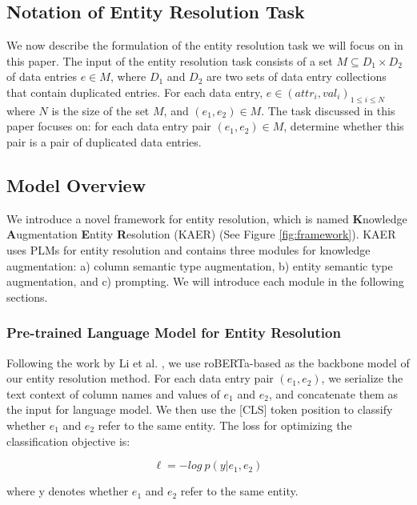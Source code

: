 


\subsection{Notation of Entity Resolution Task}
We now describe the formulation of the entity resolution task we will focus on in this paper. The input of the entity resolution task consists of a set $M \subseteq D_1 \times D_2$ of data entries $e \in M$, where $D_1$ and $D_2$ are two sets of data entry collections that contain duplicated entries. 
For each data entry, $e \in {(attr_i, val_i)}_{1 \leq i \leq N}$ where $N$ is the size of the set $M$, and $(e_1, e_2) \in M$. The task discussed in this paper focuses on: for each data entry pair $(e_1, e_2) \in M$, determine whether this pair is a pair of duplicated data entries.

\subsection{Model Overview}
We introduce a novel framework for entity resolution, which is named \textbf{K}nowledge \textbf{A}ugmentation \textbf{E}ntity \textbf{R}esolution (KAER) (See Figure \ref{fig:framework}).
KAER uses PLMs for entity resolution and contains three modules for knowledge augmentation: a) column semantic type augmentation, b) entity semantic type augmentation, and c) prompting. We will introduce each module in the following sections.


\subsubsection{Pre-trained Language Model for Entity Resolution}
Following the work by Li et al. \cite{li_deep_2020}, we use roBERTa-based as the backbone model of our entity resolution method. For each data entry pair $(e_1, e_2)$, we serialize the text context of column names and values of $e_1$ and $e_2$, and concatenate them as the input for language model. We then use the [CLS] token position to classify whether $e_1$ and $e_2$ refer to the same entity. 
The loss for optimizing the classification objective is:

\begin{equation}
    \ell = - log\ p(y | e_1, e_2)
\end{equation}

where y denotes whether $e_1$ and $e_2$ refer to the same entity. 


